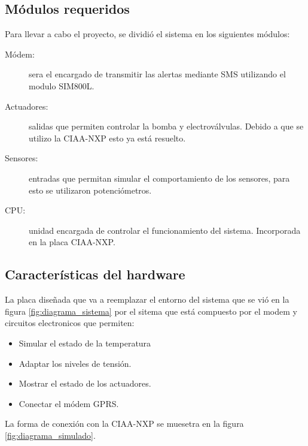 \subsection{ Módulos requeridos}
Para llevar a cabo el proyecto, se dividió el sistema en los siguientes módulos:
\begin{description}
  \item[Módem:] sera el encargado de transmitir las alertas mediante SMS utilizando el modulo SIM800L.
  \item[Actuadores:] salidas que permiten controlar la bomba y electroválvulas. Debido a que se utilizo la CIAA-NXP esto ya está resuelto.
  \item[Sensores:] entradas que permitan simular el comportamiento de los sensores, para esto se utilizaron potenciómetros.
  \item[CPU:] unidad encargada de controlar el funcionamiento del sistema. Incorporada en la placa CIAA-NXP. 
\end{description}

\subsection{Características del hardware}

La placa diseñada que va a reemplazar el entorno del sistema que se vió en la figura \ref{fig:diagrama_sistema} por el sitema que está compuesto por el modem y circuitos electronicos que permiten:
\begin{itemize}
  \item Simular el estado de la temperatura
  \item Adaptar los niveles de tensión.
  \item Mostrar el estado de los actuadores.
  \item Conectar el módem GPRS.
\end{itemize}

    La forma de conexión con la CIAA-NXP se muesetra en la figura \ref{fig:diagrama_simulado}.


